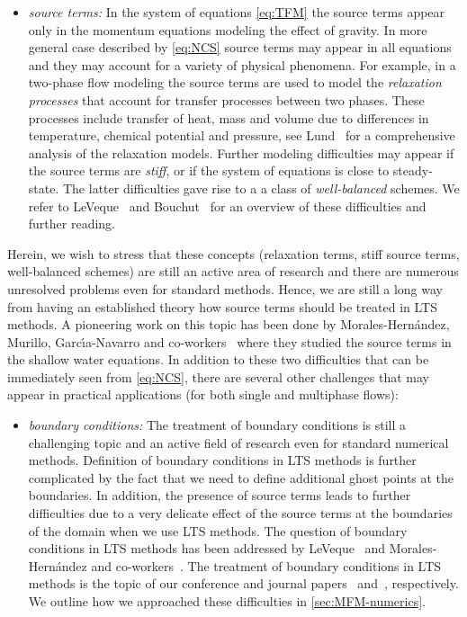 {\begin{itemize}
\item \textit{source terms:} In the system of equations \eqref{eq:TFM} the source terms appear only in the momentum equations modeling the effect of gravity. In more general case described by \eqref{eq:NCS} source terms may appear in all equations and they may account for a variety of physical phenomena. For example, in a two-phase flow modeling the source terms are used to model the \textit{relaxation processes} that account for transfer processes between two phases. These processes include transfer of heat, mass and volume due to differences in temperature, chemical potential and pressure, see Lund~\cite{lun13} for a comprehensive analysis of the relaxation models. Further modeling difficulties may appear if the source terms are \textit{stiff}, or if the system of equations is close to steady-state. The latter difficulties gave rise to a a class of \textit{well-balanced} schemes. We refer to LeVeque~\cite{lev02} and Bouchut~\cite{bou04} for an overview of these difficulties and further reading. 
\end{itemize} 

Herein, we wish to stress that these concepts (relaxation terms, stiff source terms, well-balanced schemes) are still an active area of research and there are numerous unresolved problems even for standard methods. Hence, we are still a long way from having an established theory how source terms should be treated in LTS methods. A pioneering work on this topic has been done by Morales-Hern\'{a}ndez, Murillo, Garc\'{\i}a-Navarro and co-workers~\cite{mur06,mor12a,mor12b,mor14,mor17} where they studied the source terms in the shallow water equations. 
In addition to these two difficulties that can be immediately seen from \eqref{eq:NCS}, there are several other challenges that may appear in practical applications (for both single and multiphase flows):
\begin{itemize}
\item \textit{boundary conditions:} The treatment of boundary conditions is still a challenging topic and an active field of research even for standard numerical methods. Definition of boundary conditions in LTS methods is further complicated by the fact that we need to define additional ghost points at the boundaries. In addition, the presence of source terms leads to further difficulties due to a very delicate effect of the source terms at the boundaries of the domain when we use LTS methods. The question of boundary conditions in LTS methods has been addressed by LeVeque~\cite{lev88} and Morales-Hern\'{a}ndez and co-workers~\cite{mur06,mor12a,mor12b,mor14,mor17}. The treatment of boundary conditions in LTS methods is the topic of our conference and journal papers~\cite{cp1} and~\cite{jp1}, respectively. We outline how we approached these difficulties in \cref{sec:MFM-numerics}.


\end{itemize}}
